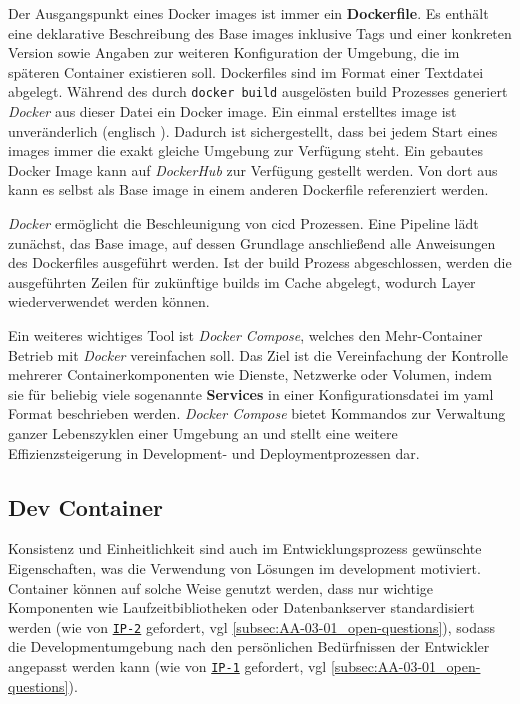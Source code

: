 Der Ausgangspunkt eines Docker \Glspl{image} ist immer ein \textbf{Dockerfile}. Es enthält eine deklarative Beschreibung des Base \Glspl{image} inklusive Tags und einer konkreten Version sowie Angaben zur weiteren Konfiguration der Umgebung, die im späteren Container existieren soll. Dockerfiles sind im Format einer Textdatei abgelegt. Während des durch \texttt{docker build} ausgelösten \Gls{build} Prozesses generiert \textit{Docker} aus dieser Datei ein Docker \Gls{image}. \cite{020:Assessing-and-Improving-Quality-of-Docker-Artifacts} Ein einmal erstelltes \Gls{image} ist unveränderlich (englisch ). Dadurch ist sichergestellt, dass bei jedem Start eines \Glspl{image} immer die exakt gleiche Umgebung zur Verfügung steht. \cite{014:Managing-Container-based-Software-Development-Environments} Ein gebautes Docker Image kann auf \textit{DockerHub} zur Verfügung gestellt werden. Von dort aus kann es selbst als Base \Gls{image} in einem anderen Dockerfile referenziert werden.

\textit{Docker} ermöglicht die Beschleunigung von \Gls{cicd} Prozessen. Eine Pipeline lädt zunächst, das Base \Gls{image}, auf dessen Grundlage anschließend alle Anweisungen des Dockerfiles ausgeführt werden. Ist der \Gls{build} Prozess abgeschlossen, werden die ausgeführten Zeilen für zukünftige \Glspl{build} im Cache abgelegt, wodurch Layer wiederverwendet werden können. \cite{022:Automated-Cloud-Infrastructure-Continous-Integration-and-Continous-Delivery-using-Docker}

Ein weiteres wichtiges Tool ist \textit{Docker Compose}, welches den Mehr-Container Betrieb mit \textit{Docker} vereinfachen soll. Das Ziel ist die Vereinfachung der Kontrolle mehrerer Containerkomponenten wie Dienste, Netzwerke oder Volumen, indem sie für beliebig viele sogenannte \textbf{Services} in einer Konfigurationsdatei im \Gls{yaml} Format beschrieben werden. \textit{Docker Compose} bietet Kommandos zur Verwaltung ganzer Lebenszyklen einer Umgebung an und stellt eine weitere Effizienzsteigerung in Development- und Deploymentprozessen dar. \cite{308:Docker-Compose-Overview}

\subsection{Dev Container}
\label{subsec:05-01-02_dev-container}

Konsistenz und Einheitlichkeit sind auch im Entwicklungsprozess gewünschte Eigenschaften, was die Verwendung von  Lösungen im \Gls{development} motiviert. Container können auf solche Weise genutzt werden, dass nur wichtige Komponenten wie Laufzeitbibliotheken oder Datenbankserver standardisiert werden (wie von \texttt{\hyperref[sec:AA-02_interview-persons]{IP-2}} gefordert, \acrshort{vgl} \autoref{subsec:AA-03-01_open-questions}), sodass die Developmentumgebung nach den persönlichen Bedürfnissen der Entwickler angepasst werden kann (wie von \texttt{\hyperref[sec:AA-02_interview-persons]{IP-1}} gefordert, \acrshort{vgl} \autoref{subsec:AA-03-01_open-questions}). \cite{014:Managing-Container-based-Software-Development-Environments}

